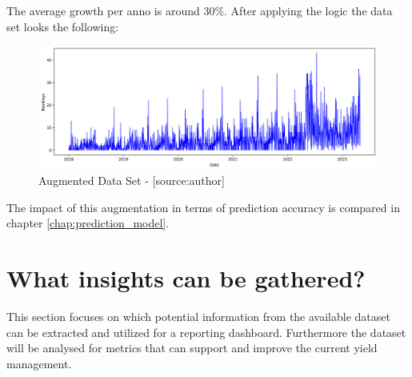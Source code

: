 The average growth per anno is around 30\%. After applying the logic the data set looks the following:  
\begin{figure}[H]
	\centering
		\includegraphics[width=14cm]{images/with_augmentation}
	\caption{Augmented Data Set - [source:author]}
	\label{fig:augmented_data}
\end{figure}
The impact of this augmentation in terms of prediction accuracy is compared in chapter \ref{chap:prediction_model}.

\section{What insights can be gathered?}
This section focuses on which potential information from the available dataset can be extracted and utilized for a reporting dashboard. Furthermore the dataset will be analysed for metrics that can support and improve the current yield management. 


